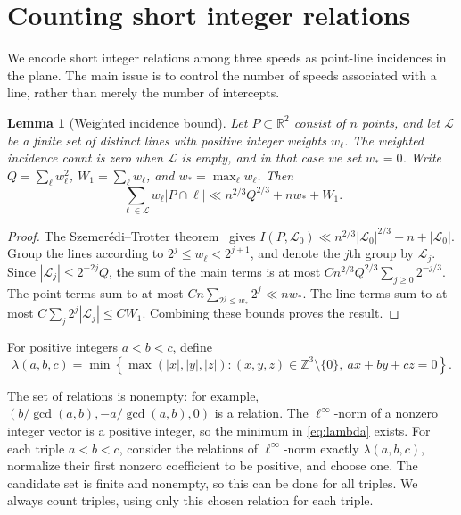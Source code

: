 \documentclass[12pt,leqno]{article}
\numberwithin{equation}{section}
\newtheorem{lemma}[theorem]{Lemma}
\theoremstyle{remark}
\newcommand{\LRinteger}{\mathbb Z}
\newcommand{\LRreal}{\mathbb R}
\begin{document}
\section{Counting short integer relations}
We encode short integer relations among three speeds as point-line incidences in the plane. The main issue is to control the number of speeds associated with a line, rather than merely the number of intercepts.
\begin{lemma}[Weighted incidence bound]\label{lem:weighted}
Let $P\subset\LRreal^2$ consist of $n$ points, and let $\mathcal L$ be a finite set of distinct lines with positive integer weights $w_\ell$. The weighted incidence count is zero when $\mathcal L$ is empty, and in that case we set $w_*=0$. Write
$Q=\sum_\ell w_\ell^2$, $W_1=\sum_\ell w_\ell$, and $w_*=\max_\ell w_\ell$. Then
\begin{equation}\label{eq:weighted}
\sum_{\ell\in\mathcal L}w_\ell|P\cap\ell|
\ll n^{2/3}Q^{2/3}+nw_*+W_1.
\end{equation}
\end{lemma}
\begin{proof}
The Szemer\'edi--Trotter theorem~\cite{ST} gives $I(P,\mathcal L_0)\ll n^{2/3}|\mathcal L_0|^{2/3}+n+|\mathcal L_0|$. Group the lines according to $2^j\le w_\ell<2^{j+1}$, and denote the $j$th group by $\mathcal L_j$. Since $|\mathcal L_j|\le2^{-2j}Q$, the sum of the main terms is at most $Cn^{2/3}Q^{2/3}\sum_{j\ge0}2^{-j/3}$. The point terms sum to at most $Cn\sum_{2^j\le w_*}2^j\ll nw_*$. The line terms sum to at most $C\sum_j2^j|\mathcal L_j|\le CW_1$. Combining these bounds proves the result.
\end{proof}

For positive integers $a<b<c$, define
\begin{equation}\label{eq:lambda}
\lambda(a,b,c)=\min\left\{\max(|x|,|y|,|z|):
(x,y,z)\in\LRinteger^3\setminus\{0\},\ ax+by+cz=0\right\}.
\end{equation}


The set of relations is nonempty: for example, $(b/\gcd(a,b),-a/\gcd(a,b),0)$ is a relation. The $\ell^\infty$-norm of a nonzero integer vector is a positive integer, so the minimum in \eqref{eq:lambda} exists. For each triple $a<b<c$, consider the relations of $\ell^\infty$-norm exactly $\lambda(a,b,c)$, normalize their first nonzero coefficient to be positive, and choose one. The candidate set is finite and nonempty, so this can be done for all triples. We always count triples, using only this chosen relation for each triple.
\end{document}
